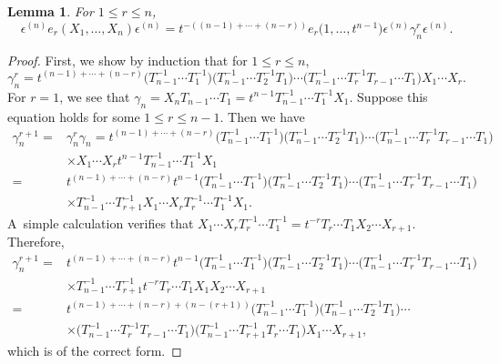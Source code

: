 \documentclass[10pt,a4paper]{amsart}
\numberwithin{equation}{section}
\newtheorem{Lemma}[Theorem]{Lemma}
\theoremstyle{definition}
\begin{document}
\begin{Lemma}\label{multiplication in terms of gamma}
For $1\leq r \leq n$,
\[\epsilon^{(n)}e_r(X_1,\dots, X_n)\epsilon^{(n)} = t^{-( (n-1)+\cdots + (n-r))}e_r\bigl(1,\dots,t^{n-1}\bigr) \epsilon^{(n)} \gamma_n^r \epsilon^{(n)}.\]
\end{Lemma}
\begin{proof}
 First, we show by induction that for $1 \leq r \leq n$,
 \[
 \gamma_n^{r} = t^{(n-1)+\cdots + (n-r)} \bigl(T_{n-1}^{-1}\cdots T_1^{-1}\bigr)\bigl(T_{n-1}^{-1}\cdots T_2^{-1}T_1\bigr)\cdots \bigl(T_{n-1}^{-1}\cdots T_r^{-1}T_{r-1}\cdots T_1\bigr) X_1\cdots X_r.
 \]
 For $r=1$, we see that
$
 \gamma_n = X_nT_{n-1}\cdots T_1 = t^{n-1}T_{n-1}^{-1}\cdots T_1^{-1}X_1$.
 Suppose this equation holds for some $1\leq r \leq n-1$. Then we have
 \begin{align*}
 \gamma_n^{r+1} = {}&\gamma_n^{r} \gamma_n
 = t^{(n-1)+\cdots + (n-r)} \bigl(T_{n-1}^{-1}\cdots T_1^{-1}\bigr)\bigl(T_{n-1}^{-1}\cdots T_2^{-1}T_1\bigr)\cdots \bigl(T_{n-1}^{-1}\cdots T_r^{-1}T_{r-1}\cdots T_1\bigr) \\
 &\times X_1\cdots X_r t^{n-1}T_{n-1}^{-1}\cdots T_1^{-1}X_1 \\
 = {}& t^{(n-1)+\cdots + (n-r)} t^{n-1}\bigl(T_{n-1}^{-1}\cdots T_1^{-1}\bigr)\bigl(T_{n-1}^{-1}\cdots T_2^{-1}T_1\bigr)\cdots \bigl(T_{n-1}^{-1}\cdots T_r^{-1}T_{r-1}\cdots T_1\bigr) \\
 & \times T_{n-1}^{-1}\cdots T_{r+1}^{-1} X_1\cdots X_r T_r^{-1}\cdots T_1^{-1}X_1.
 \end{align*}
 A~simple calculation verifies that
$
 X_1\cdots X_r T_r^{-1}\cdots T_1^{-1} = t^{-r} T_r\cdots T_1 X_2\cdots X_{r+1}$.
 Therefore,
 \begin{align*}
 \gamma_n^{r+1} ={}& t^{(n-1)+\cdots + (n-r)} t^{n-1}\bigl(T_{n-1}^{-1}\cdots T_1^{-1}\bigr)\bigl(T_{n-1}^{-1}\cdots T_2^{-1}T_1\bigr)\cdots \bigl(T_{n-1}^{-1}\cdots T_r^{-1}T_{r-1}\cdots T_1\bigr) \\
 & \times T_{n-1}^{-1}\cdots T_{r+1}^{-1} t^{-r} T_r\cdots T_1 X_1X_2\cdots X_{r+1} \\
 ={}& t^{(n-1)+\cdots + (n-r) +(n-(r+1))} \bigl(T_{n-1}^{-1}\cdots T_1^{-1}\bigr)\bigl(T_{n-1}^{-1}\cdots T_2^{-1}T_1\bigr) \cdots \\
 & \times \bigl(T_{n-1}^{-1}\cdots T_r^{-1}T_{r-1}\cdots T_1\bigr) \bigl(T_{n-1}^{-1}\cdots T_{r+1}^{-1} T_r\cdots T_1\bigr) X_1\cdots X_{r+1} ,
 \end{align*}
which is of the correct form.


\end{proof}
\end{document}
